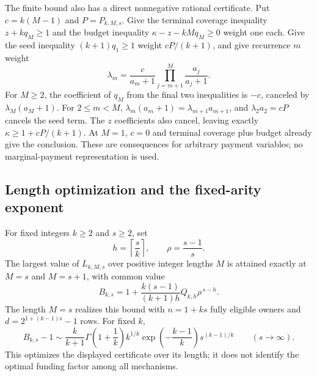 The finite bound also has a direct nonnegative rational certificate.
Put $c=k(M-1)$ and $P=P_{k,M,s}$.  Give the terminal coverage inequality
$z+kq_M\geq1$ and the budget inequality
$\kappa-z-kMq_M\geq0$ weight one each.  Give the seed inequality
$(k+1)q_1\geq1$ weight $cP/(k+1)$, and give recurrence $m$ weight
\begin{equation}
  \lambda_m=\frac{c}{a_m+1}
    \prod_{j=m+1}^{M}\frac{a_j}{a_j+1}.
  \label{arity:certificate-weights}
\end{equation}
For $M\geq2$, the coefficient of $q_M$ from the final two inequalities is
$-c$, canceled by $\lambda_M(a_M+1)$.  For $2\leq m<M$,
$\lambda_m(a_m+1)=\lambda_{m+1}a_{m+1}$, and
$\lambda_2a_2=cP$ cancels the seed term.  The $z$ coefficients also cancel,
leaving exactly $\kappa\geq1+cP/(k+1)$.  At $M=1$, $c=0$ and terminal
coverage plus budget already give the conclusion.  These are consequences
for arbitrary payment variables; no marginal-payment representation is used.

\subsection{Length optimization and the fixed-arity exponent}
\label{arity:rate-section}

\begin{corollary}
\label{arity:optimized}
For fixed integers $k\geq2$ and $s\geq2$, set
\[
  h=\left\lceil\frac{s}{k}\right\rceil,
  \qquad \rho=\frac{s-1}{s}.
\]
The largest value of $L_{k,M,s}$ over positive integer lengths $M$ is
attained exactly at $M=s$ and $M=s+1$, with common value
\begin{equation}
  B_{k,s}
  =1+\frac{k(s-1)}{(k+1)h}Q_{k,h}\rho^{\,s-h}.
  \label{arity:optimized-bound}
\end{equation}
The length $M=s$ realizes this bound with
$n=1+ks$ fully eligible owners and $d=2^{1+(k-1)s}-1$ rows.  For fixed $k$,
\begin{equation}
  B_{k,s}-1\sim
  \frac{k}{k+1}\Gamma\!\left(1+\frac1k\right)
       k^{1/k}\exp\!\left(-\frac{k-1}{k}\right)
       s^{(k-1)/k}
       \qquad(s\longrightarrow\infty).
  \label{arity:asymptotic}
\end{equation}
This optimizes the displayed certificate over its length; it does not
identify the optimal funding factor among all mechanisms.
\end{corollary}

